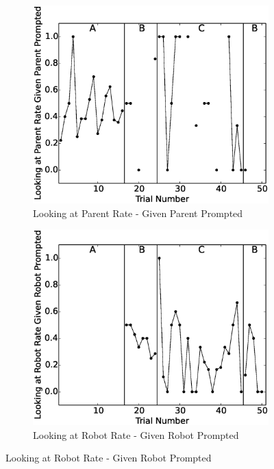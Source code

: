 \documentclass{ut-thesis}
\begin{document}
\begin{figure}[h]
	\centering
	\begin{subfigure}[b]{0.49\textwidth}
		\includegraphics[width=1.1\linewidth]{./img/data_analysis/8LookingatParentRateGivenParentPrompted.eps}
		\caption{Looking at Parent Rate - Given Parent Prompted}
		\label{fig:8LookingatParentRateGivenParentPrompted}
	\end{subfigure}
	\hfill
	\begin{subfigure}[b]{0.49\textwidth}
		\includegraphics[width=1.1\linewidth]{./img/data_analysis/9LookingatRobotRateGivenRobotPrompted.eps}
		\caption{Looking at Robot Rate - Given Robot Prompted}
		\label{fig:9LookingatRobotRateGivenRobotPrompted}
	\end{subfigure}%


\end{figure}
\end{document}
